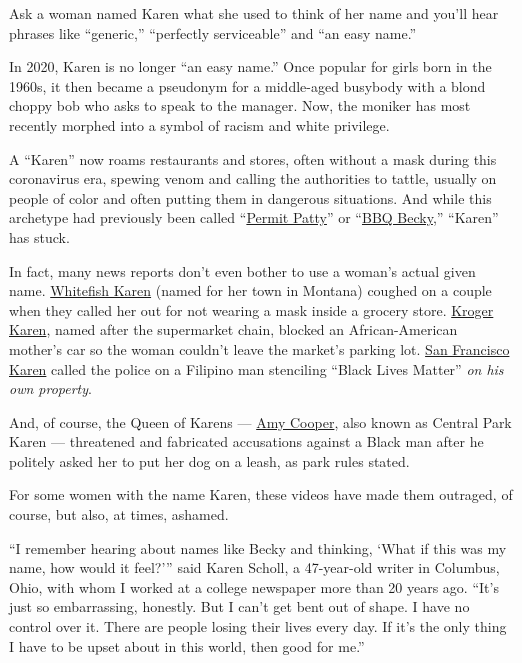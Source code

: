 Ask a woman named Karen what she used to think of her name and you'll
hear phrases like ``generic,'' ``perfectly serviceable'' and ``an easy
name.''

In 2020, Karen is no longer ``an easy name.'' Once popular for girls
born in the 1960s, it then became a pseudonym for a middle-aged busybody
with a blond choppy bob who asks to speak to the manager. Now, the
moniker has most recently morphed into a symbol of racism and white
privilege.

A ``Karen'' now roams restaurants and stores, often without a mask
during this coronavirus era, spewing venom and calling the authorities
to tattle, usually on people of color and often putting them in
dangerous situations. And while this archetype had previously been
called
``\href{https://www.cnn.com/2018/06/25/us/permit-patty-san-francisco-trnd/index.html}{Permit
Patty}'' or
``\href{https://www.newsweek.com/bbq-becky-white-woman-who-called-cops-black-bbq-911-audio-released-im-really-1103057}{BBQ
Becky},'' ``Karen'' has stuck.

In fact, many news reports don't even bother to use a woman's actual
given name. \href{https://www.youtube.com/watch?v=qHqzg3vgW4I}{Whitefish
Karen} (named for her town in Montana) coughed on a couple when they
called her out for not wearing a mask inside a grocery store.
\href{https://www.metrotimes.com/news-hits/archives/2020/06/17/metro-detroits-own-kroger-karen-prevents-black-customer-from-leaving-the-parking-lot-in-viral-video}{Kroger
Karen}, named after the supermarket chain, blocked an African-American
mother's car so the woman couldn't leave the market's parking lot.
\href{https://sfist.com/2020/06/14/sf-karen-filmed-confronting-pacific-heights-man-over-writing-black-lives-matter-on-his-property/}{San
Francisco Karen} called the police on a Filipino man stenciling ``Black
Lives Matter'' \emph{on his own property}.

And, of course, the Queen of Karens ---
\href{https://www.nytimes3xbfgragh.onion/2020/06/14/nyregion/central-park-amy-cooper-christian-racism.html}{Amy
Cooper}, also known as Central Park Karen --- threatened and fabricated
accusations against a Black man after he politely asked her to put her
dog on a leash, as park rules stated.

For some women with the name Karen, these videos have made them
outraged, of course, but also, at times, ashamed.

``I remember hearing about names like Becky and thinking, `What if this
was my name, how would it feel?''' said Karen Scholl, a 47-year-old
writer in Columbus, Ohio, with whom I worked at a college newspaper more
than 20 years ago. ``It's just so embarrassing, honestly. But I can't
get bent out of shape. I have no control over it. There are people
losing their lives every day. If it's the only thing I have to be upset
about in this world, then good for me.''

